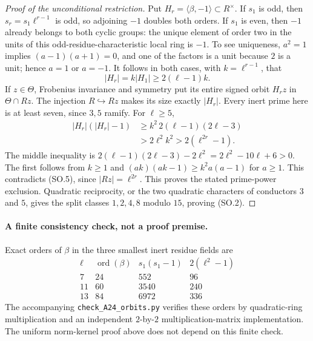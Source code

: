 \begin{proof}[Proof of the unconditional restriction]
Put $H_r=\langle\beta,-1\rangle\subset R^\times$.
If $s_1$ is odd, then $s_r=s_1\ell^{r-1}$ is odd, so adjoining
$-1$ doubles both orders.  If $s_1$ is even, then $-1$ already
belongs to both cyclic groups: the unique element of order two
in the units of this odd-residue-characteristic local ring is
$-1$.  To see uniqueness, $a^2=1$ implies
$(a-1)(a+1)=0$, and one of the factors is a unit because
$2$ is a unit; hence $a=1$ or $a=-1$.
It follows in both cases, with $k=\ell^{r-1}$, that
\[
                      |H_r|=k|H_1|\ge2(\ell-1)k.           \tag{SO.14}
\]
If $z\in\Theta$, Frobenius invariance and symmetry put its
entire signed orbit $H_rz$ in $\Theta\cap Rz$.  The injection
$R\hookrightarrow Rz$ makes its size exactly $|H_r|$.
Every inert prime here is at least seven, since $3,5$ ramify.
For $\ell\ge5$,
\[
\begin{split}
 |H_r|(|H_r|-1)
  &\ge k^2\,2(\ell-1)(2\ell-3)\\
  &>2\ell^2 k^2
   >2(\ell^{2r}-1).
\end{split}                                                \tag{SO.15}
\]
The middle inequality is
$2(\ell-1)(2\ell-3)-2\ell^2=2\ell^2-10\ell+6>0$.
The first follows from $k\ge1$ and
$(ak)(ak-1)\ge k^2a(a-1)$ for $a\ge1$.
This contradicts (SO.5), since $|Rz|=\ell^{2r}$.
This proves the stated
prime-power exclusion.  Quadratic reciprocity, or the two
quadratic characters of conductors $3$ and $5$, gives the split
classes $1,2,4,8$ modulo $15$, proving (SO.2).
\end{proof}

\paragraph{A finite consistency check, not a proof premise.}
Exact orders of $\beta$ in the three smallest inert residue fields
are
\[
\begin{array}{c|r|r|r}
 \ell&\operatorname{ord}(\beta)&s_1(s_1-1)&2(\ell^2-1)\\\hline
 7&24&552&96\\
 11&60&3540&240\\
 13&84&6972&336
\end{array}
\]
The accompanying \texttt{check\_A24\_orbits.py} verifies these
orders by quadratic-ring multiplication and an independent
$2$-by-$2$ multiplication-matrix implementation.  The uniform
norm-kernel proof above does not depend on this finite check.

